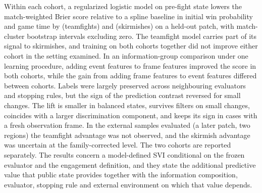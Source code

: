 \begin{abstracten}
Within each cohort, a regularized logistic model on pre-fight state lowers the match-weighted Brier score relative to a spline baseline in initial win probability and game time by \dBrierT{} (teamfights) and \dBrierS{} (skirmishes) on a held-out patch, with match-cluster bootstrap intervals excluding zero. The teamfight model carries part of its signal to skirmishes, and training on both cohorts together did not improve either cohort in the setting examined. In an information-group comparison under one learning procedure, adding event features to frame features improved the score in both cohorts, while the gain from adding frame features to event features differed between cohorts. Labels were largely preserved across neighbouring evaluators and stopping rules, but the sign of the prediction contrast reversed for small changes. The lift is smaller in balanced states, survives filters on small changes, coincides with a larger discrimination component, and keeps its sign in cases with a fresh observation frame. In the external samples evaluated (a later patch, two regions) the teamfight advantage was not observed, and the skirmish advantage was uncertain at the family-corrected level. The two cohorts are reported separately. The results concern a model-defined SVI conditional on the frozen evaluator and the engagement definition, and they state the additional predictive value that public state provides together with the information composition, evaluator, stopping rule and external environment on which that value depends.
\end{abstracten}
